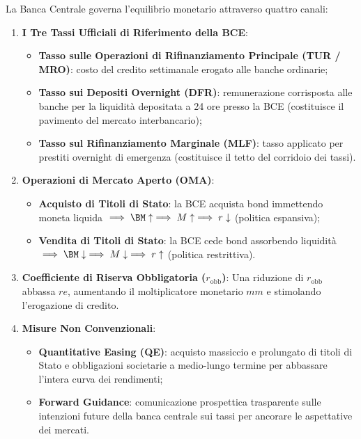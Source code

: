 La Banca Centrale governa l'equilibrio monetario attraverso quattro canali:
\begin{enumerate}
    \item \textbf{I Tre Tassi Ufficiali di Riferimento della BCE}:
    \begin{itemize}
        \item \textbf{Tasso sulle Operazioni di Rifinanziamento Principale (TUR / MRO)}: costo del credito settimanale erogato alle banche ordinarie;
        \item \textbf{Tasso sui Depositi Overnight (DFR)}: remunerazione corrisposta alle banche per la liquidità depositata a 24 ore presso la BCE (costituisce il pavimento del mercato interbancario);
        \item \textbf{Tasso sul Rifinanziamento Marginale (MLF)}: tasso applicato per prestiti overnight di emergenza (costituisce il tetto del corridoio dei tassi).
    \end{itemize}
    
    \item \textbf{Operazioni di Mercato Aperto (OMA)}:
    \begin{itemize}
        \item \textbf{Acquisto di Titoli di Stato}: la BCE acquista bond immettendo moneta liquida $\implies \BM \uparrow \implies M \uparrow \implies r \downarrow$ (politica espansiva);
        \item \textbf{Vendita di Titoli di Stato}: la BCE cede bond assorbendo liquidità $\implies \BM \downarrow \implies M \downarrow \implies r \uparrow$ (politica restrittiva).
    \end{itemize}
    
    \item \textbf{Coefficiente di Riserva Obbligatoria ($r_{\text{obb}}$)}:
    Una riduzione di $r_{\text{obb}}$ abbassa $re$, aumentando il moltiplicatore monetario $mm$ e stimolando l'erogazione di credito.
    
    \item \textbf{Misure Non Convenzionali}:
    \begin{itemize}
        \item \textbf{Quantitative Easing (QE)}: acquisto massiccio e prolungato di titoli di Stato e obbligazioni societarie a medio-lungo termine per abbassare l'intera curva dei rendimenti;
        \item \textbf{Forward Guidance}: comunicazione prospettica trasparente sulle intenzioni future della banca centrale sui tassi per ancorare le aspettative dei mercati.
    \end{itemize}
\end{enumerate}

